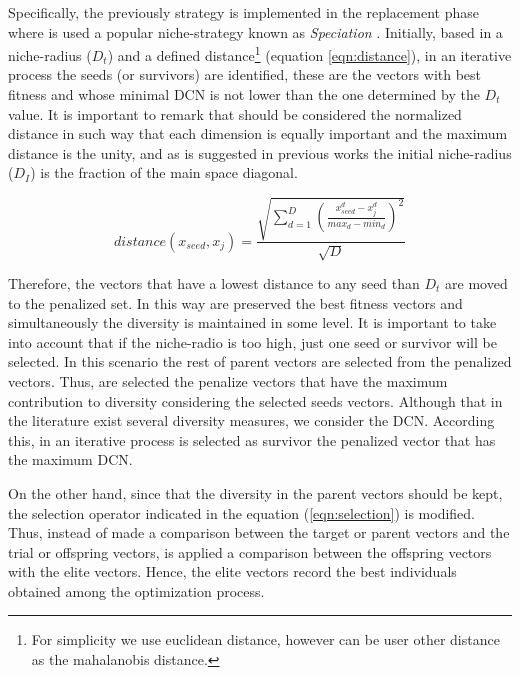 %
Specifically, the previously strategy is implemented in the replacement phase  where is used a popular niche-strategy known as \textit{Speciation} \cite{yang2017multimodal}.
%
Initially, based in a niche-radius ($D_t$) and a defined distance\footnote{For simplicity we use euclidean distance, however can be user other distance as the mahalanobis distance.} (equation \ref{eqn:distance}), in an iterative process the seeds (or survivors) are identified, these are the vectors with best fitness and whose minimal DCN is not lower than the one determined by the $D_t$ value.
%
It is important to remark that should be considered the normalized distance in such way that each dimension is equally important and the maximum distance is the unity, and as is suggested in previous works the initial niche-radius ($D_I$) is the fraction of the main space diagonal.

\begin{equation}\label{eqn:distance}
distance ( x_{seed}, x_j ) = \frac{\sqrt{ \sum_{d=1}^D \left ( \frac{x_{seed}^d - x_j^d}{max_d - min_d} \right )^2  }} {\sqrt{D}}
\end{equation}

%
Therefore, the vectors that have a lowest distance to any seed than $D_t$ are moved to the penalized set.
%
In this way are preserved the best fitness vectors and simultaneously the diversity is maintained in some level.
%
It is important to take into account that if the niche-radio is too high, just one seed or survivor will be selected.
%
In this scenario the rest of parent vectors are selected from the penalized vectors.
%
Thus, are selected the penalize vectors that have the maximum contribution to diversity considering the selected seeds vectors.
%
Although that in the literature exist several diversity measures, we consider the DCN.
%
According this, in an iterative process is selected as survivor the penalized vector that has the maximum DCN.


On the other hand, since that the diversity in the parent vectors should be kept, the selection operator indicated in the equation (\ref{eqn:selection}) is modified.
%
Thus, instead of made a comparison between the target or parent vectors and the trial or offspring vectors, is applied a comparison between the offspring vectors with the elite vectors.
%
Hence, the elite vectors record the best individuals obtained among the optimization process.
%


